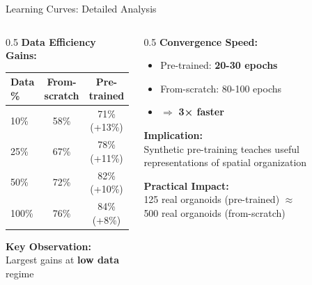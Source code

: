 \documentclass[aspectratio=169]{beamer}
\begin{document}
\begin{frame}{Learning Curves: Detailed Analysis}
    \begin{columns}
        \begin{column}{0.5\textwidth}
            \textbf{Data Efficiency Gains:}
            \begin{table}
                \footnotesize
                \begin{tabular}{lcc}
                    \toprule
                    \textbf{Data \%} & \textbf{From-scratch} & \textbf{Pre-trained} \\
                    \midrule
                    10\% & 58\% & 71\% (\textcolor{cysticGreen}{+13\%}) \\
                    25\% & 67\% & 78\% (\textcolor{cysticGreen}{+11\%}) \\
                    50\% & 72\% & 82\% (\textcolor{cysticGreen}{+10\%}) \\
                    100\% & 76\% & 84\% (\textcolor{cysticGreen}{+8\%}) \\
                    \bottomrule
                \end{tabular}
            \end{table}
            
            \vspace{0.5em}
            \textbf{Key Observation:}\\
            Largest gains at \textbf{low data} regime
        \end{column}
        \begin{column}{0.5\textwidth}
            \textbf{Convergence Speed:}
            \begin{itemize}
                \item Pre-trained: \textbf{20-30 epochs}
                \item From-scratch: 80-100 epochs
                \item $\Rightarrow$ \textbf{3× faster}
            \end{itemize}
            
            \vspace{0.5em}
            \textbf{Implication:}\\
            Synthetic pre-training teaches useful representations of spatial organization
            
            \vspace{0.5em}
            \textbf{Practical Impact:}\\
            125 real organoids (pre-trained) $\approx$\\
            500 real organoids (from-scratch)
        \end{column}
    \end{columns}
\end{frame}
\end{document}
